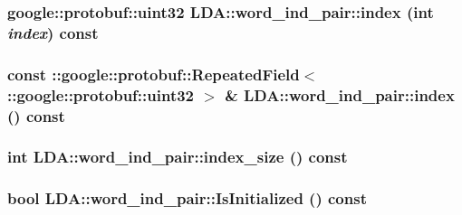 \label{class_l_d_a_1_1word__ind__pair_a961e6d93c3a647d4ca58cfdca7fe012c}
\hypertarget{class_l_d_a_1_1word__ind__pair_a367d992d06596d1962c68826a54cb9a2}{
\subsubsection[{index}]{\setlength{\rightskip}{0pt plus 5cm}google::protobuf::uint32 LDA::word\_\-ind\_\-pair::index (int {\em index}) const}}
\label{class_l_d_a_1_1word__ind__pair_a367d992d06596d1962c68826a54cb9a2}
\hypertarget{class_l_d_a_1_1word__ind__pair_a8a6b466c602c2f0ba788f0d63eaef8cb}{
\subsubsection[{index}]{\setlength{\rightskip}{0pt plus 5cm}const ::google::protobuf::RepeatedField$<$::google::protobuf::uint32 $>$ \& LDA::word\_\-ind\_\-pair::index () const}}
\label{class_l_d_a_1_1word__ind__pair_a8a6b466c602c2f0ba788f0d63eaef8cb}
\hypertarget{class_l_d_a_1_1word__ind__pair_a2f15d45424493c3381d9de74858449a2}{
\subsubsection[{index\_\-size}]{\setlength{\rightskip}{0pt plus 5cm}int LDA::word\_\-ind\_\-pair::index\_\-size () const}}
\label{class_l_d_a_1_1word__ind__pair_a2f15d45424493c3381d9de74858449a2}
\hypertarget{class_l_d_a_1_1word__ind__pair_a1161972f297fe3164a5fd6dfa9f22cf8}{
\subsubsection[{IsInitialized}]{\setlength{\rightskip}{0pt plus 5cm}bool LDA::word\_\-ind\_\-pair::IsInitialized () const}}
